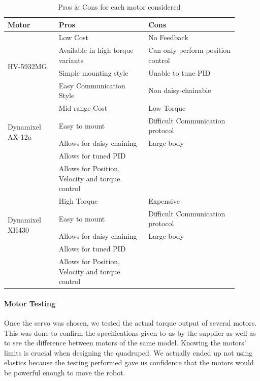             \begin{table} [H]
                \centering
                    \begin{tabular}{|p{0.2\linewidth}|p{0.35\linewidth}|p{0.35\linewidth}|}
                        \hline
                        Motor  & Pros & Cons \\
                        \hline
                        \multirow{4}{*}{HV-5932MG}& Low Cost  & No Feedback\\
                            & Available in high torque variants & Can only perform position control\\
                            & Simple mounting style & Unable to tune PID\\
                            & Easy Communication Style & Non daisy-chainable \\
                            \hline
                        \multirow{4}{*}{Dynamixel AX-12a}  & Mid range  Cost   &  Low Torque\\
                            & Easy to mount & Difficult Communication protocol \\
                            & Allows for daisy chaining & Large body\\
                            & Allows for tuned PID & \\
                            & Allows for Position, Velocity and torque control& \\
                            \hline
                        \multirow{4}{*}{Dynamixel XH430}  & High Torque  & Expensive\\
                            & Easy to mount & Difficult Communication protocol \\
                            & Allows for daisy chaining & Large body \\
                            & Allows for tuned PID & \\
                            & Allows for Position, Velocity and torque control& \\
                        \hline
                    \end{tabular}
                    \caption{Pros \& Cons for each motor considered}
                    \label{tab:MotorComparison}
                \end{table}

            \paragraph{Motor Testing} \label{par:MotorTesting}
                Once the servo was chosen, we tested the actual torque output of several motors. This was done to confirm the specifications given to us by the supplier as well as to see the difference between motors of the same model. Knowing the motors' limits is crucial when designing the quadruped. We actually ended up not using elastics because the testing performed gave us confidence that the motors would be powerful enough to move the robot.
                
